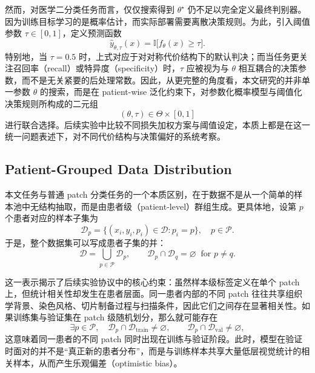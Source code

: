 然而，对医学二分类任务而言，仅仅搜索得到 $\theta^{\star}$ 仍不足以完全定义最终判别器。因为训练目标学习的是概率估计，而实际部署需要离散决策规则。为此，引入阈值参数 $\tau \in [0,1]$，定义预测函数
\begin{equation}
    \hat{y}_{\theta,\tau}(x)
    =
    \mathbb{I}\bigl[f_{\theta}(x) \geq \tau\bigr].
\end{equation}
特别地，当 $\tau = 0.5$ 时，上式对应于对对称代价结构下的默认判决；而当任务更关注召回率（recall）或特异度（specificity）时，$\tau$ 应被视为与 $\theta$ 相互耦合的决策参数，而不是无关紧要的后处理常数。因此，从更完整的角度看，本文研究的并非单一参数 $\theta$ 的搜索，而是在 patient-wise 泛化约束下，对参数化概率模型与阈值化决策规则所构成的二元组
\begin{equation}
    (\theta, \tau) \in \Theta \times [0,1]
\end{equation}
进行联合选择。后续实验中比较不同损失加权方案与阈值设定，本质上都是在这一统一问题表述下，对不同代价结构与决策偏好的系统考察。

\subsection{Patient-Grouped Data Distribution}

本文任务与普通 patch 分类任务的一个本质区别，在于数据不是从一个简单的样本池中无结构抽取，而是由患者级（patient-level）群组生成。更具体地，设第 $p$ 个患者对应的样本子集为
\begin{equation}
    \mathcal{D}_{p} = \{(x_i,y_i,p_i) \in \mathcal{D} : p_i = p\}, \quad p \in \mathcal{P}.
\end{equation}
于是，整个数据集可以写成患者子集的并：
\begin{equation}
    \mathcal{D} = \bigcup_{p \in \mathcal{P}} \mathcal{D}_{p},
    \qquad
    \mathcal{D}_{p} \cap \mathcal{D}_{q} = \varnothing \;\; \text{for } p \neq q.
\end{equation}

这一表示揭示了后续实验协议中的核心约束：虽然样本级标签定义在单个 patch 上，但统计相关性却发生在患者层面。同一患者内部的不同 patch 往往共享组织学背景、染色风格、切片制备过程与扫描条件，因此它们之间存在显著相关性。如果训练集与验证集在 patch 级随机划分，那么就可能存在
\begin{equation}
    \exists p \in \mathcal{P}, \quad
    \mathcal{D}_{p} \cap \mathcal{D}_{\mathrm{train}} \neq \varnothing,
    \qquad
    \mathcal{D}_{p} \cap \mathcal{D}_{\mathrm{val}} \neq \varnothing,
\end{equation}
这意味着同一患者的不同 patch 同时出现在训练与验证阶段。此时，模型在验证时面对的并不是“真正新的患者分布”，而是与训练样本共享大量低层视觉统计的相关样本，从而产生乐观偏差（optimistic bias）。

